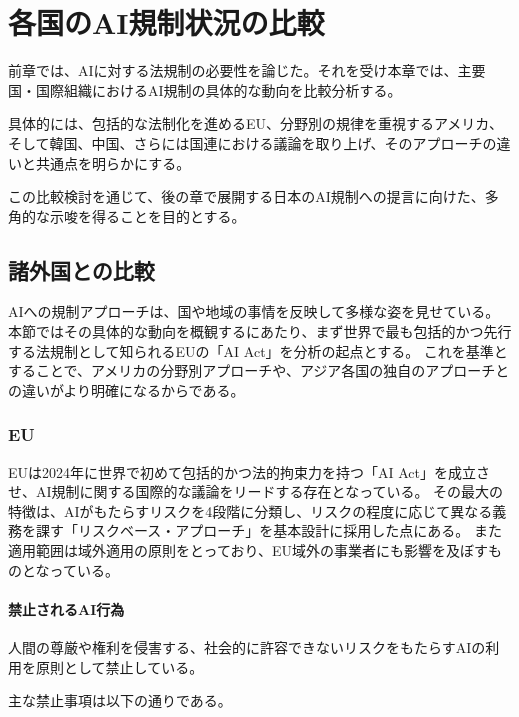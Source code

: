 \chapter{各国のAI規制状況の比較}

前章では、AIに対する法規制の必要性を論じた。それを受け本章では、主要国・国際組織におけるAI規制の具体的な動向を比較分析する。

具体的には、包括的な法制化を進めるEU、分野別の規律を重視するアメリカ、そして韓国、中国、さらには国連における議論を取り上げ、そのアプローチの違いと共通点を明らかにする。

この比較検討を通じて、後の章で展開する日本のAI規制への提言に向けた、多角的な示唆を得ることを目的とする。

\section{諸外国との比較}

AIへの規制アプローチは、国や地域の事情を反映して多様な姿を見せている。本節ではその具体的な動向を概観するにあたり、まず世界で最も包括的かつ先行する法規制として知られるEUの「AI Act」を分析の起点とする。
これを基準とすることで、アメリカの分野別アプローチや、アジア各国の独自のアプローチとの違いがより明確になるからである。

\subsection{EU}
EUは2024年に世界で初めて包括的かつ法的拘束力を持つ「AI Act」を成立させ、AI規制に関する国際的な議論をリードする存在となっている。
その最大の特徴は、AIがもたらすリスクを4段階に分類し、リスクの程度に応じて異なる義務を課す「リスクベース・アプローチ」を基本設計に採用した点にある。
また適用範囲は域外適用の原則をとっており、EU域外の事業者にも影響を及ぼすものとなっている。

\subsubsection{禁止されるAI行為}
人間の尊厳や権利を侵害する、社会的に許容できないリスクをもたらすAIの利用を原則として禁止している。

主な禁止事項は以下の通りである。

